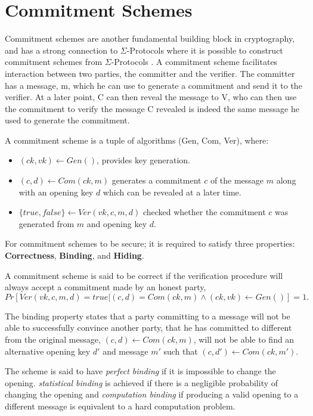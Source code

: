 \section{Commitment Schemes}
\label{sec:background:commitment}
Commitment schemes are another fundamental building block in cryptography, and
has a strong connection to $\Sigma$-Protocols where it is possible to construct
commitment schemes from $\Sigma$-Protocols \cite{cryptoeprint:2019:1185}.
A commitment scheme facilitates interaction between two parties, the committer
and the verifier.
The committer has a message, m, which he can use to generate a commitment and
send it to the verifier.
At a later point, C can then reveal the message
to V, who can then use the commitment to verify the message C revealed is indeed
the same message he used to generate the commitment.

\begin{definition}
A commitment scheme is a tuple of algorithms (Gen, Com, Ver), where:
\begin{itemize}
  \item $(ck, vk) \leftarrow Gen()$, provides key generation.
  \item $(c, d) \leftarrow Com(ck, m)$ generates a commitment $c$ of the message
    $m$ along with an opening key $d$ which can be revealed at a later time.
  \item $\{true, false\} \leftarrow Ver(vk, c, m, d)$ checked whether the
    commitment $c$ was generated from $m$ and opening key $d$.
\end{itemize}
\end{definition}

For commitment schemes to be secure; it is required to satisfy three
properties: \textbf{Correctness}, \textbf{Binding}, and \textbf{Hiding}.

\begin{definition}[correctness]
  A commitment scheme is said to be correct if
  the verification procedure  will always accept a commitment made by an honest party,
 \ie
$$
Pr[Ver(vk, c, m, d) = true | (c, d) = Com(ck, m) \land (ck, vk) \leftarrow Gen()] = 1.
$$
\end{definition}

\begin{definition}[binding]
The binding property states that a party committing to a message will not be
able to successfully convince another party, that he has committed to different
from the original message, \ie $(c, d) \leftarrow Com(ck, m)$, will not be able
to find an alternative opening key $d'$ and message $m'$ such that
$(c, d') \leftarrow Com(ck, m')$.

The scheme is said to have \textit{perfect binding} if it is impossible to change the
opening.
\textit{statistical binding} is achieved if there is a negligible probability of changing
the opening and \textit{computation binding} if producing a valid opening to a
different message is equivalent to a hard computation problem.
\end{definition}

